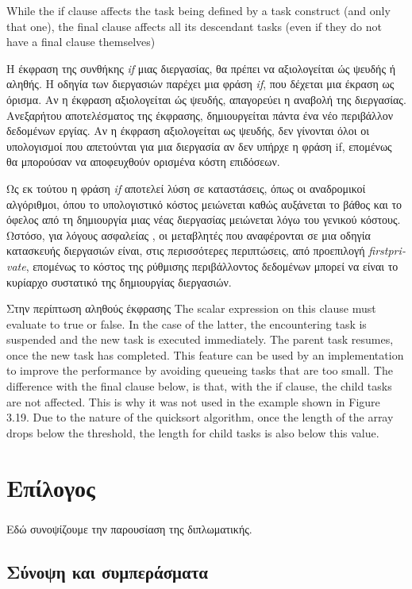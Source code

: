\documentclass[12pt]{article}
\newcommand{\en}[1]{\foreignlanguage{english}{#1}}
\begin{document}
\clearpage
While the if clause affects the task being defined by a task construct (and only
that one), the final clause affects all its descendant tasks (even if they do not have a
final clause themselves)

Η έκφραση της συνθήκης \emph{\en{if}} μιας διεργασίας, θα πρέπει να αξιολογείται ώς ψευδής ή αληθής. 
Η οδηγία των διεργασιών παρέχει μια φράση \emph{\en{if}}, που δέχεται μια έκραση ως όρισμα. Αν η έκφραση αξιολογείται ώς ψευδής, απαγορεύει η αναβολή της διεργασίας.
Ανεξαρήτου αποτελέσματος της έκφρασης, δημιουργείται πάντα ένα νέο περιβάλλον δεδομένων εργίας. Αν η έκφραση αξιολογείται ως ψευδής, δεν γίνονται όλοι οι υπολογισμοί που απετούνται για μια διεργασία αν δεν υπήρχε η φράση if, επομένως θα μπορούσαν να αποφευχθούν ορισμένα κόστη επιδόσεων.

Ως εκ τούτου η φράση \emph{\en{if}} αποτελεί λύση σε καταστάσεις, όπως οι αναδρομικοί αλγόριθμοι, όπου
το υπολογιστικό κόστος μειώνεται καθώς αυξάνεται το βάθος και το όφελος από τη δημιουργία μιας νέας διεργασίας
μειώνεται λόγω του γενικού κόστους.
Ωστόσο, για λόγους ασφαλείας \cite{parallel_dist}, οι μεταβλητές που αναφέρονται σε μια οδηγία κατασκευής διεργασιών είναι, στις περισσότερες περιπτώσεις, από προεπιλογή \emph{\en{firstprivate}}, επομένως το κόστος
της ρύθμισης περιβάλλοντος δεδομένων μπορεί να είναι το κυρίαρχο συστατικό της δημιουργίας διεργασιών.


Στην περίπτωση αληθούς έκφρασης
The scalar expression on this clause must evaluate to true or false. In the case of the latter, the encountering task is suspended and the new task is executed immediately. The parent task resumes, once the new task has completed.
This feature can be used by an implementation to improve the performance by avoiding queueing tasks that are too small.
The difference with the final clause below, is that, with the if clause, the child tasks are not affected. This is why it was not used in the example shown in Figure 3.19. Due to the nature of the quicksort algorithm, once the length of the array drops below the threshold, the length for child tasks is also below this value.



\clearpage

\section{Επίλογος}
\subparagraph{}
Εδώ συνοψίζουμε την παρουσίαση της διπλωματικής.

\subsection{Σύνοψη και συμπεράσματα}
\subparagraph{}
\end{document}
